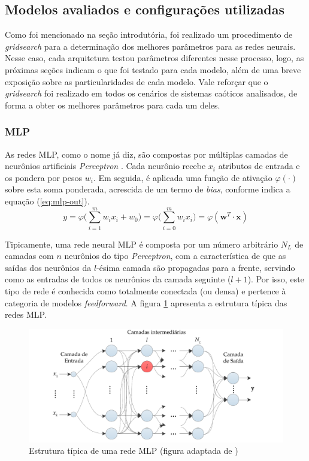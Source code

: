 \documentclass{article}
\begin{document}
\subsection{Modelos avaliados e configurações utilizadas}


Como foi mencionado na seção introdutória, foi realizado um procedimento de \textit{gridsearch} para a determinação dos melhores parâmetros para as redes neurais. Nesse caso, cada arquitetura testou parâmetros diferentes nesse processo, logo, as próximas seções indicam o que foi testado para cada modelo, além de uma breve exposição sobre as particularidades de cada modelo. Vale reforçar que o \textit{gridsearch} foi realizado em todos os cenários de sistemas caóticos analisados, de forma a obter os melhores parâmetros para cada um deles.

\subsubsection{MLP}

As redes MLP, como o nome já diz, são compostas por múltiplas camadas de neurônios artificiais \textit{Perceptron}  \cite{rosenblatt1958perceptron}. Cada neurônio recebe $x_i$ atributos de entrada e os pondera por pesos $w_i$. Em seguida, é aplicada uma função de ativação $\varphi(\cdot)$ sobre esta soma ponderada, acrescida de um termo de \textit{bias}, conforme indica a equação (\ref{eq:mlp-out}).
\begin{equation}\label{eq:mlp-out}
y = \varphi  \Big(\sum_{i=1}^{m}w_i x_i + w_0 \Big) = \varphi \Big(\sum_{i=0}^{m}w_i x_i \Big) = \varphi (\mathbf{w}^T \cdot \mathbf{x})
\end{equation}

Tipicamente, uma rede neural MLP é composta por um número arbitrário $N_L$ de  camadas com $n$ neurônios do tipo \textit{Perceptron}, com a característica de que as saídas dos neurônios da $l$-ésima camada são propagadas para a frente, servindo como as entradas de todos os neurônios da camada seguinte ($l+1$). Por isso, este tipo de rede é conhecida como totalmente conectada (ou densa) e pertence à categoria de modelos \textit{feedforward}. A figura \ref{fig:mlp-architecture} apresenta a estrutura típica das redes MLP.
\begin{figure}[H]
\centering
\includegraphics[scale = 0.3]{mlp-network.pdf}
\caption{Estrutura típica de uma rede MLP (figura adaptada de \cite{boccato2013novas}) }
\label{fig:mlp-architecture}
\end{figure}
\end{document}
